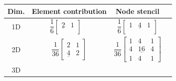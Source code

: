 \begin{table}
  \centering
  \begin{tabular}{|c|c|c|c}
      \hline
      Dim. & Element contribution & Node stencil\\
      \hline
      1D &
  \begin{minipage}{4.5cm}
    \begin{equation*}
       \dfrac1{6}\left[\begin{array}{ccc}
          \underline{2} & 1\\
      \end{array}\right] \quad 
    \end{equation*}
  \end{minipage} 
      &
  \begin{minipage}{4.5cm}
    \begin{equation*}
      \dfrac1{6}\left[\begin{array}{ccc}
          1 & \underline{4} & 1\\
      \end{array}\right]
    \end{equation*}
  \end{minipage} 
       \\[4mm]
       \hline
      2D&
  \begin{minipage}{5cm}
    \begin{equation*}
      \dfrac1{36}\left[
        \begin{array}{ccc}
          2 & 1 \\
          \underline{4} & 2
        \end{array}
      \right]
    \end{equation*}
  \end{minipage}  &
  \begin{minipage}{5cm}
    \begin{equation*}
        \dfrac1{36}\left[
          \begin{array}{ccc}
            1 & 4 & 1\\
            4 & \underline{16} & 4 \\
            1 & 4 & 1
          \end{array}
        \right]
    \end{equation*}
  \end{minipage}  \\[4mm]
      \hline
      3D &
  \begin{minipage}{6cm}
    \begin{equation*}
      \begin{array}{ll}

\end{array}
\end{equation*}
\end{minipage}
\end{tabular}
\end{table}

